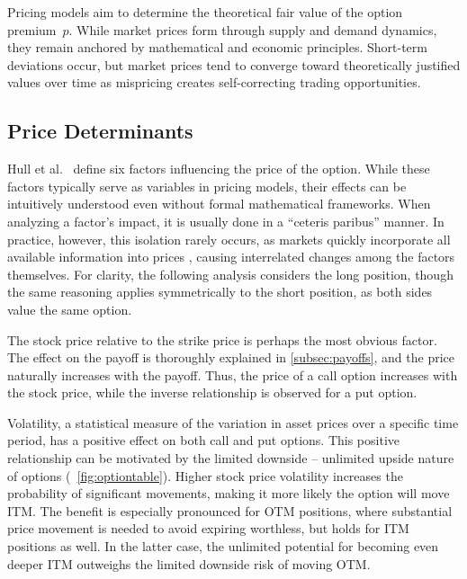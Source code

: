 \documentclass[english,12pt,a4paper,pdftex,sci,utf8]{aaltothesis}
\begin{document}
Pricing models aim to determine the theoretical fair value of the option \mbox{premium $p$.} While market prices form through supply and demand dynamics, they remain anchored by mathematical and economic principles. Short-term deviations occur, but market prices tend to converge toward theoretically justified values over time as mispricing creates self-correcting trading opportunities.

\clearpage

\subsection{Price Determinants}

Hull et al.\ \cite{hull2013fundamentals} define six factors influencing the price of the option. While these factors typically serve as variables in pricing models, their effects can be intuitively understood even without formal mathematical frameworks. When analyzing a factor's impact, it is usually done in a ``ceteris paribus'' manner. In practice, however, this isolation rarely occurs, as markets quickly incorporate all available information into prices \cite{fama1970efficient}, causing interrelated changes among the factors themselves. For clarity, the following analysis considers the long position, though the same reasoning applies symmetrically to the short position, as both sides value the same option.

The stock price relative to the strike price is perhaps the most obvious factor. The effect on the payoff is thoroughly explained in \cref{subsec:payoffs}, and the price naturally increases with the payoff. Thus, the price of a call option increases with the stock price, while the inverse relationship is observed for a put option.

Volatility, a statistical measure of the variation in asset prices over a specific time period, has a positive effect on both call and put options. This positive relationship can be motivated by the limited downside -- unlimited upside nature of options (~\ref{fig:optiontable}). Higher stock price volatility increases the probability of significant movements, making it more likely the option will move ITM. The benefit is especially pronounced for OTM positions, where substantial price movement is needed to avoid expiring worthless, but holds for ITM positions as well. In the latter case, the unlimited potential for becoming even deeper ITM outweighs the limited downside risk of moving OTM.
\end{document}
